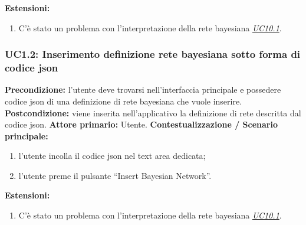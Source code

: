                     \textbf{Estensioni:} \begin{enumerate}
                            \item C’è stato un problema con l’interpretazione della rete bayesiana \underline{\textit{UC10.1}}.
                        \end{enumerate}
                        
                \subsubsection{UC1.2: Inserimento definizione rete bayesiana sotto forma di codice json}
                    \textbf{Precondizione:}  l’utente deve trovarsi nell’interfaccia principale e possedere codice json di una definizione di rete bayesiana che vuole inserire.
                    \newline
                    \textbf{Postcondizione:} viene inserita nell’applicativo la definizione di rete descritta dal codice json.
                    \newline
                    \textbf{Attore primario:} Utente.
                    \newline
                    \textbf{Contestualizzazione / Scenario principale:} \begin{enumerate}
                        \item l’utente incolla il codice json nel text area dedicata;
                        \item l’utente preme il pulsante “Insert Bayesian Network”.
                    \end{enumerate}
                    
                    \textbf{Estensioni:} \begin{enumerate}
                            \item C’è stato un problema con l’interpretazione della rete bayesiana \underline{\textit{UC10.1}}.
                        \end{enumerate}
                        
